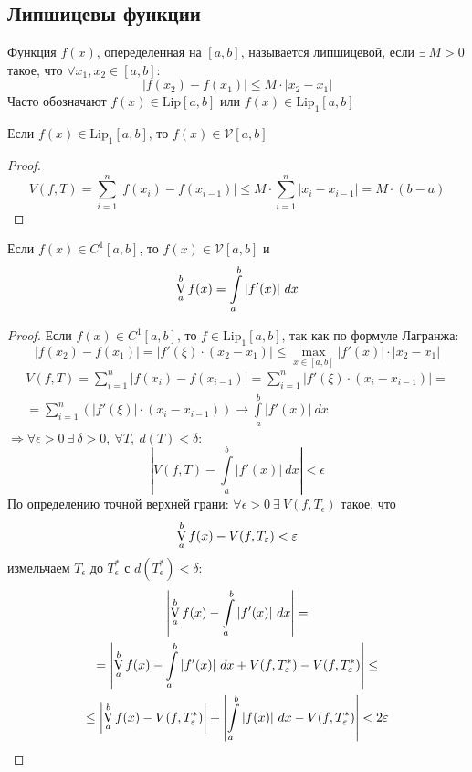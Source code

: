 \subsection{Липшицевы функции}
\begin{definition}
Функция $f(x)$, опеределенная на $[a,b]$, называется липшицевой, если $\exists\ M>0$ такое, что $\forall x_1,x_2\in [a,b]:$
\[|f(x_2)-f(x_1)|\leq M\cdot |x_2-x_1|\]
Часто обозначают $f(x)\in \text{Lip}[a,b]$ или $f(x)\in \text{Lip}_1[a,b]$
\end{definition} 
\begin{theorem}
    Если $f(x)\in \text{Lip}_1[a,b]$, то $f(x)\in \mathcal{V}[a,b]$
\end{theorem} 
\begin{proof}
    \[V(f,T)=\sum\limits_{i=1}^{n}|f(x_i)-f(x_{i-1})|\leq M\cdot\sum\limits_{i=1}^{n}|x_i-x_{i-1}|=M\cdot (b-a)\]
\end{proof} 
\begin{theorem}
    Если $f(x)\in C^1[a,b]$, то $f(x)\in \mathcal{V}[a,b]$ и 
    \[\operatorname*{V}\limits_{a}^{b} f(x)=\int\limits_{a}^{b}|f'(x)|\ dx\]
\end{theorem} 
\begin{proof}
    Если $f(x)\in C^1[a,b]$, то $f\in \text{Lip}_1[a,b]$, так как по формуле Лагранжа:
    \[|f(x_2)-f(x_1)|=|f'(\xi)\cdot (x_2-x_1)|\leq \max\limits_{x\in [a,b]}|f'(x)|\cdot|x_2-x_1|\]
    \begin{multline*}
        V(f, T)=\sum\limits_{i=1}^{n}|f(x_i)-f(x_{i-1})|=\sum\limits_{i=1}^{n} |f'(\xi)\cdot (x_i-x_{i-1})|=\\
        =\sum\limits_{i=1}^{n} (|f'(\xi)|\cdot (x_i-x_{i-1}))\to \int\limits_{a}^{b}|f'(x)|\ dx
    \end{multline*}
    $\Rightarrow \forall \epsilon>0\ \exists\ \delta>0,\ \forall T,\ d(T)<\delta$:
    \[\left|V(f,T)-\int\limits_{a}^{b}|f'(x)|\ dx\right|<\epsilon\]
    По определению точной верхней грани: $\forall \epsilon>0\ \exists\ V(f,T_{\epsilon})$ такое, что
    \[\operatorname*{V}\limits_{a}^{b} f(x)-V(f,T_{\varepsilon})<\varepsilon\]
    измельчаем $T_{\epsilon}$ до $T_{\epsilon}^*$ с $d(T_{\epsilon}^*)<\delta$:
    \begin{multline*}
        \left| \variation\limits_{a}^{b} f(x)-\int\limits_{a}^{b}|f'(x)|\ dx \right|=\\=\left|\variation\limits_{a}^{b} f(x)-\int\limits_{a}^{b}|f'(x)|\ dx+V(f,T_{\epsilon}^*)-V(f, T_{\epsilon}^*)\right|\leq\\
        \leq \left|\variation\limits_{a}^{b} f(x)-V(f, T_{\epsilon}^*)\right|+\left|\int\limits_{a}^{b}|f(x)|\ dx-V(f,T_{\epsilon}^*)\right|<2\epsilon
    \end{multline*}
\end{proof}

